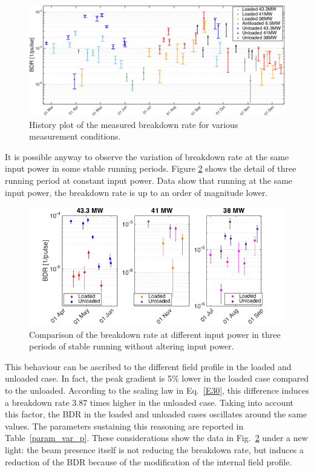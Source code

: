 \begin{landscape}

\begin{figure}[p]
\centering 
\includegraphics[scale=0.61]{pictures/bdr_hist_2.png}
\caption{History plot of the measured breakdown rate for various measurement conditions.}
\label{BDR_history}
\end{figure}
 
\end{landscape}

It is possible anyway to observe the variation of breakdown rate at the same input power in some stable running periods. Figure \ref{BDR_3sectors} shows the detail of three running period at constant input power. Data show that running at the same input power, the breakdown rate is up to an order of magnitude lower. 

\begin{figure}[h]
\centering 
\includegraphics[scale=0.5]{pictures/BDR_zooms.png}
\caption{Comparison of the breakdown rate at different input power in three periods of stable running without altering input power.}
\label{BDR_3sectors}
\end{figure}

This behaviour can be ascribed to the different field profile in the loaded and unloaded case. In fact, the peak gradient is 5\% lower in the loaded case compared to the unloaded. According to the scaling law in Eq.~\ref{E30}, this difference induces a breakdown rate 3.87 times higher in the unloaded case. Taking into account this factor, the BDR in the loaded and unloaded cases oscillates around the same values. The parameters sustaining this reasoning are reported in Table~\ref{param_var_p}.  These considerations show the data in Fig.~\ref{BDR_3sectors} under a new light: the beam presence itself is not reducing the breakdown rate, but induces a reduction of the BDR because of the modification of the internal field profile.

